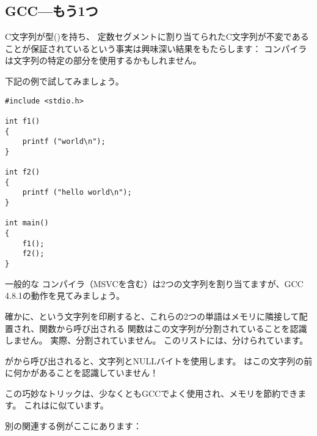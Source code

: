 \subsection{GCC---もう1つ}
\label{use_parts_of_C_strings}

C文字列が型()を持ち、
定数セグメントに割り当てられたC文字列が不変であることが保証されているという事実は興味深い結果をもたらします：
コンパイラは文字列の特定の部分を使用するかもしれません。

下記の例で試してみましょう。

\begin{lstlisting}[style=customc]
#include <stdio.h>

int f1()
{
	printf ("world\n");
}

int f2()
{
	printf ("hello world\n");
}

int main()
{
	f1();
	f2();
}
\end{lstlisting}

一般的な \CCpp{} コンパイラ（MSVCを含む）は2つの文字列を割り当てますが、GCC 4.8.1の動作を見てみましょう。



確かに、という文字列を印刷すると、これらの2つの単語はメモリに隣接して配置され、関数から呼び出される \puts 関数はこの文字列が分割されていることを認識しません。 
実際、分割されていません。 このリストには、分けられています。

\puts がから呼び出されると、文字列とNULLバイトを使用します。 \puts はこの文字列の前に何かがあることを認識していません！

この巧妙なトリックは、少なくともGCCでよく使用され、メモリを節約できます。 これはに似ています。

別の関連する例がここにあります：
